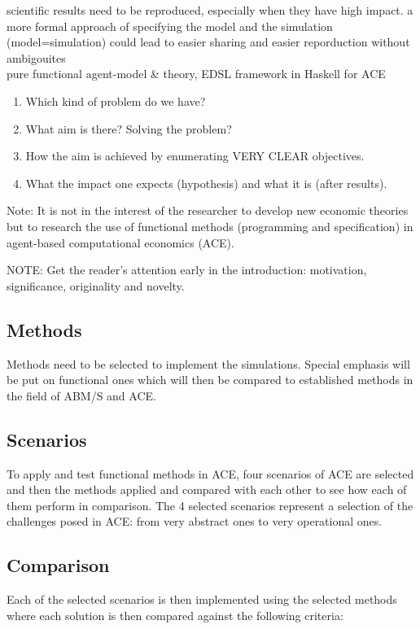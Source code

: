 \documentclass{article}
\begin{document}
scientific results need to be reproduced, especially when they have high impact. a more formal approach of specifying the model and the simulation (model=simulation) could lead to easier sharing and easier reporduction without ambigouites \\

pure functional agent-model \& theory, EDSL framework in Haskell for ACE

\begin{enumerate}
\item Which kind of problem do we have?
\item What aim is there? Solving the problem? 
\item How the aim is achieved by enumerating VERY CLEAR objectives.
\item What the impact one expects (hypothesis) and what it is (after results).
\end{enumerate}

Note: It is not in the interest of the researcher to develop new economic theories but to research the use of functional methods (programming and specification) in agent-based computational economics (ACE).

NOTE: Get the reader’s attention early in the introduction: motivation, significance, originality and novelty.

\subsection{Methods}
Methods need to be selected to implement the simulations. Special emphasis will be put on functional ones which will then be compared to established methods in the field of ABM/S and ACE. 

\subsection{Scenarios}
To apply and test functional methods in ACE, four scenarios of ACE are selected and then the methods applied and compared with each other to see how each of them perform in comparison. The 4 selected scenarios represent a selection of the challenges posed in ACE: from very abstract ones to very operational ones.

\subsection{Comparison}
Each of the selected scenarios is then implemented using the selected methods where each solution is then compared against the following criteria: 
\end{document}
